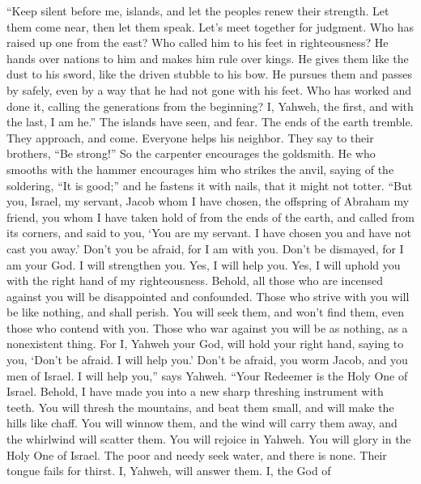  ``Keep silent before me, islands, and let the peoples
renew their strength. Let them come near, then let them speak. Let's
meet together for judgment.  Who has raised up one from
the east? Who called him to his feet in righteousness? He hands over
nations to him and makes him rule over kings. He gives them like the
dust to his sword, like the driven stubble to his bow.  He
pursues them and passes by safely, even by a way that he had not gone
with his feet.  Who has worked and done it, calling the
generations from the beginning? I, Yahweh, the first, and with the last,
I am he.''  The islands have seen, and fear. The ends of
the earth tremble. They approach, and come.  Everyone
helps his neighbor. They say to their brothers, ``Be strong!''
 So the carpenter encourages the goldsmith. He who smooths
with the hammer encourages him who strikes the anvil, saying of the
soldering, ``It is good;'' and he fastens it with nails, that it might
not totter.  ``But you, Israel, my servant, Jacob whom I
have chosen, the offspring of Abraham my friend,  you whom
I have taken hold of from the ends of the earth, and called from its
corners, and said to you, `You are my servant. I have chosen you and
have not cast you away.'  Don't you be afraid, for I am
with you. Don't be dismayed, for I am your God. I will strengthen you.
Yes, I will help you. Yes, I will uphold you with the right hand of my
righteousness.  Behold, all those who are incensed
against you will be disappointed and confounded. Those who strive with
you will be like nothing, and shall perish.  You will
seek them, and won't find them, even those who contend with you. Those
who war against you will be as nothing, as a nonexistent thing.
 For I, Yahweh your God, will hold your right hand,
saying to you, `Don't be afraid. I will help you.'  Don't
be afraid, you worm Jacob, and you men of Israel. I will help you,''
says Yahweh. ``Your Redeemer is the Holy One of Israel. 
Behold, I have made you into a new sharp threshing instrument with
teeth. You will thresh the mountains, and beat them small, and will make
the hills like chaff.  You will winnow them, and the wind
will carry them away, and the whirlwind will scatter them. You will
rejoice in Yahweh. You will glory in the Holy One of Israel.
 The poor and needy seek water, and there is none. Their
tongue fails for thirst. I, Yahweh, will answer them. I, the God of
